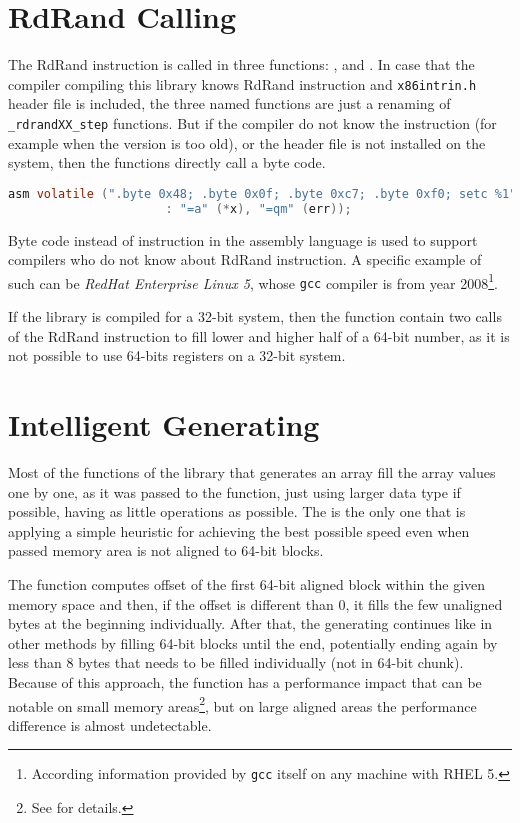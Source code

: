 \section{RdRand Calling}
\par{
The RdRand instruction is called in three functions: ,  and . In case that the compiler compiling this library knows RdRand instruction and {\tt x86intrin.h} header file is included, the three named functions are just a renaming of {\tt \_rdrandXX\_step} functions. But if the compiler do not know the instruction (for example when the version is too old), or the header file is not installed on the system, then the functions directly call a byte code.
}
\begin{lstlisting}[frame=none, basicstyle=\footnotesize\ttfamily, language=C, numbers=none, numberstyle=\tiny\color{black},caption= {Byte code called in {\tt rdrand64\_step}.}]
 asm volatile (".byte 0x48; .byte 0x0f; .byte 0xc7; .byte 0xf0; setc %1"
                      : "=a" (*x), "=qm" (err));
\end{lstlisting}

\par{
Byte code instead of instruction in the assembly language is used to support compilers who do not know about RdRand instruction. A specific example of such can be {\em RedHat Enterprise Linux 5}, whose {\tt gcc} compiler is from year 2008\footnote{According information provided by {\tt gcc} itself on any machine with RHEL 5.}. 
}

\par{
If the library is compiled for a 32-bit system, then the  function contain two calls of the RdRand instruction to fill lower and higher half of a 64-bit number, as it is not possible to use 64-bits registers on a 32-bit system. 
}
\section{Intelligent Generating}
\par{
Most of the functions of the library that generates an array fill the array values one by one, as it was passed to the function, just using larger data type if possible, having as little operations as possible. The  is the only one that is applying a simple heuristic for achieving the best possible speed even when passed memory area is not aligned to 64-bit blocks.
}

\par{
The function computes offset of the first 64-bit aligned block within the given memory space and then, if the offset is different than 0, it fills the few unaligned bytes at the beginning individually. After that, the generating continues like in other methods by filling 64-bit blocks until the end, potentially ending again by less than 8 bytes that needs to be filled individually (not in 64-bit chunk). Because of this approach, the function has a performance impact that can be notable on small memory areas\footnote{See  for details.}, but on large aligned areas the performance difference is almost undetectable. 
}

